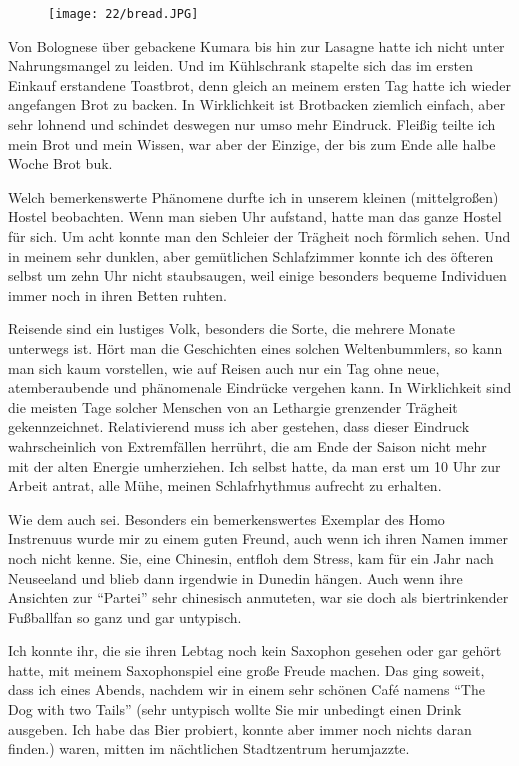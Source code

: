 \begin{figure}[h]
  \centering
  \texttt{[image: 22/bread.JPG]}
\end{figure}
Von Bolognese über gebackene Kumara bis hin zur Lasagne hatte ich
nicht unter Nahrungsmangel zu leiden. Und im Kühlschrank stapelte sich
das im ersten Einkauf erstandene Toastbrot, denn gleich an meinem
ersten Tag hatte ich wieder angefangen Brot zu backen. In Wirklichkeit
ist Brotbacken ziemlich einfach, aber sehr lohnend und schindet
deswegen nur umso mehr Eindruck. Fleißig teilte ich mein Brot und mein
Wissen, war aber der Einzige, der bis zum Ende alle halbe Woche Brot
buk.

Welch bemerkenswerte Phänomene durfte ich in unserem kleinen
(mittelgroßen) Hostel beobachten. Wenn man sieben Uhr aufstand, hatte
man das ganze Hostel für sich. Um acht konnte man den Schleier der
Trägheit noch förmlich sehen. Und in meinem sehr dunklen, aber
gemütlichen Schlafzimmer konnte ich des öfteren selbst um zehn Uhr
nicht staubsaugen, weil einige besonders bequeme Individuen immer noch
in ihren Betten ruhten.

Reisende sind ein lustiges Volk, besonders die Sorte, die mehrere
Monate unterwegs ist. Hört man die Geschichten eines solchen
Weltenbummlers, so kann man sich kaum vorstellen, wie auf Reisen auch
nur ein Tag ohne neue, atemberaubende und phänomenale Eindrücke
vergehen kann. In Wirklichkeit sind die meisten Tage solcher Menschen
von an Lethargie grenzender Trägheit gekennzeichnet. Relativierend
muss ich aber gestehen, dass dieser Eindruck wahrscheinlich von
Extremfällen herrührt, die am Ende der Saison nicht mehr mit der alten
Energie umherziehen. Ich selbst hatte, da man erst um 10 Uhr zur
Arbeit antrat, alle Mühe, meinen Schlafrhythmus aufrecht zu erhalten.

Wie dem auch sei. Besonders ein bemerkenswertes Exemplar des Homo
Instrenuus wurde mir zu einem guten Freund, auch wenn ich ihren Namen
immer noch nicht kenne. Sie, eine Chinesin, entfloh dem Stress, kam
für ein Jahr nach Neuseeland und blieb dann irgendwie in Dunedin
hängen.  Auch wenn ihre Ansichten zur ``Partei'' sehr chinesisch
anmuteten, war sie doch als biertrinkender Fußballfan so ganz und gar
untypisch.

Ich konnte ihr, die sie ihren Lebtag noch kein Saxophon
gesehen oder gar gehört hatte, mit meinem Saxophonspiel eine große
Freude machen. Das ging soweit, dass ich eines Abends, nachdem wir in
einem sehr schönen Café namens ``The Dog with two Tails'' (sehr
untypisch wollte Sie mir unbedingt einen Drink ausgeben. Ich habe das
Bier probiert, konnte aber immer noch nichts daran finden.) waren,
mitten im nächtlichen Stadtzentrum herumjazzte.

